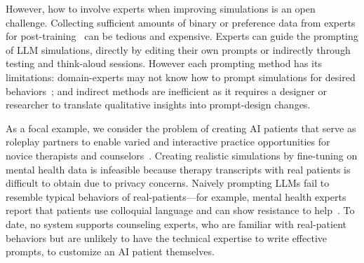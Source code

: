 \documentclass[11pt]{article}
\begin{document}
However, how to involve experts when improving simulations is an open challenge. Collecting sufficient amounts of binary or preference data from experts for post-training~\cite{christiano2017deep, rafailov2024direct} can be tedious and expensive. Experts can guide the prompting of LLM simulations, directly by editing their own prompts or indirectly through testing and think-aloud sessions. However each prompting method has its limitations: domain-experts may not know how to prompt simulations for desired behaviors~\cite{whyjohnnycantprompt}; and indirect methods are inefficient as it requires a designer or researcher to translate qualitative insights into prompt-design changes. 

As a focal example, we consider the problem of creating AI patients that serve as roleplay partners to enable varied and interactive practice opportunities for novice therapists and counselors~\cite{yao2022learning}. 
Creating realistic simulations by fine-tuning on mental health data is infeasible because therapy transcripts with real patients is difficult to obtain due to privacy concerns.
Naively prompting LLMs fail to resemble typical behaviors of real-patients—for example, mental health experts report that patients use colloquial language and can show resistance to help~\cite{chen2023llmempowered}.  
To date, no system supports counseling experts, who are familiar with real-patient behaviors but are unlikely to have the technical expertise to write effective prompts, to customize an AI patient themselves.


\end{document}
